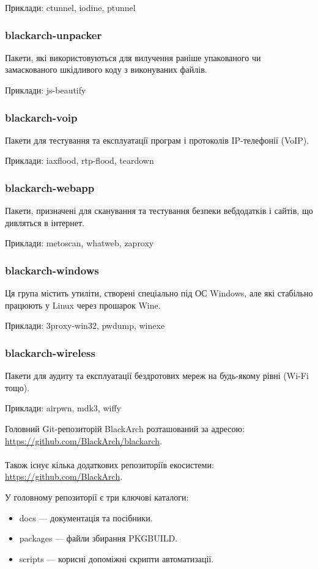 \documentclass[a4paper, oneside, 11pt]{book}
\begin{document}
Приклади: ctunnel, iodine, ptunnel

\subsubsection{blackarch-unpacker}
Пакети, які використовуються для вилучення раніше упакованого чи замаскованого шкідливого коду з виконуваних файлів.

Приклади: js-beautify

\subsubsection{blackarch-voip}
Пакети для тестування та експлуатації програм і протоколів IP-телефонії (VoIP).

Приклади: iaxflood, rtp-flood, teardown

\subsubsection{blackarch-webapp}
Пакети, призначені для сканування та тестування безпеки вебдодатків і сайтів, що дивляться в інтернет.

Приклади: metoscan, whatweb, zaproxy

\subsubsection{blackarch-windows}
Ця група містить утиліти, створені спеціально під ОС Windows, але які стабільно працюють у Linux через прошарок Wine.

Приклади: 3proxy-win32, pwdump, winexe

\subsubsection{blackarch-wireless}
Пакети для аудиту та експлуатації бездротових мереж на будь-якому рівні (Wi-Fi тощо).

Приклади: airpwn, mdk3, wiffy

Головний Git-репозиторій BlackArch розташований за адресою: \\
\url{https://github.com/BlackArch/blackarch}. \\
\\Також існує кілька додаткових репозиторіїв екосистеми: \\
\url{https://github.com/BlackArch}.

У головному репозиторії є три ключові каталоги:
\begin{itemize}
\item docs --- документація та посібники.
\item packages --- файли збирання PKGBUILD.
\item scripts --- корисні допоміжні скрипти автоматизації.
\end{itemize}
\end{document}
